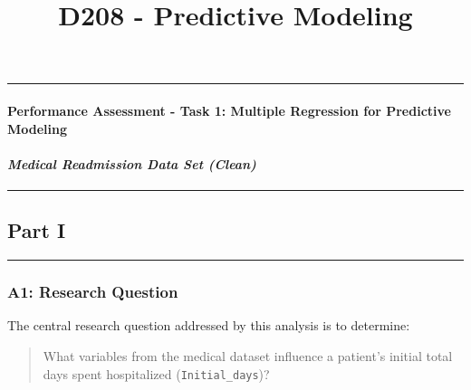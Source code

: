 \documentclass[
]{article}
\title{D208 - Predictive Modeling}
\author{}
\date{\vspace{-2.5em}}
\begin{document}
\maketitle

{
\setcounter{tocdepth}{2}
\tableofcontents
}
\begin{center}\rule{0.5\linewidth}{0.5pt}\end{center}

\hypertarget{performance-assessment---task-1-multiple-regression-for-predictive-modeling}{%
\paragraph{\texorpdfstring{\textbf{Performance Assessment - Task 1:
Multiple Regression for Predictive
Modeling}}{Performance Assessment - Task 1: Multiple Regression for Predictive Modeling}}\label{performance-assessment---task-1-multiple-regression-for-predictive-modeling}}

\hypertarget{medical-readmission-data-set-clean}{%
\paragraph{\texorpdfstring{\emph{Medical Readmission Data Set
(Clean)}}{Medical Readmission Data Set (Clean)}}\label{medical-readmission-data-set-clean}}

\begin{center}\rule{0.5\linewidth}{0.5pt}\end{center}

\hypertarget{part-i}{%
\subsection{Part I}\label{part-i}}

\begin{center}\rule{0.5\linewidth}{0.5pt}\end{center}

\hypertarget{a1-research-question}{%
\subsubsection{A1: Research Question}\label{a1-research-question}}

The central research question addressed by this analysis is to
determine:

\begin{quote}
What variables from the medical dataset influence a patient's initial
total days spent hospitalized (\texttt{Initial\_days})?
\end{quote}
\end{document}
